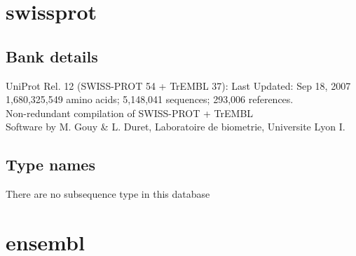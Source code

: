 \documentclass{article}
\begin{document}
\begin{Schunk}
\section{ swissprot }
\subsection{Bank details}
UniProt Rel. 12 (SWISS-PROT 54 + TrEMBL 37): Last Updated: Sep 18, 2007\\
1,680,325,549 amino acids; 5,148,041 sequences; 293,006 references.\\
Non-redundant compilation of SWISS-PROT + TrEMBL\\
Software by M. Gouy \& L. Duret, Laboratoire de biometrie, Universite Lyon I.

\subsection{Type names}
There are no subsequence type in this database
\section{ ensembl }

\end{Schunk}
\end{document}
